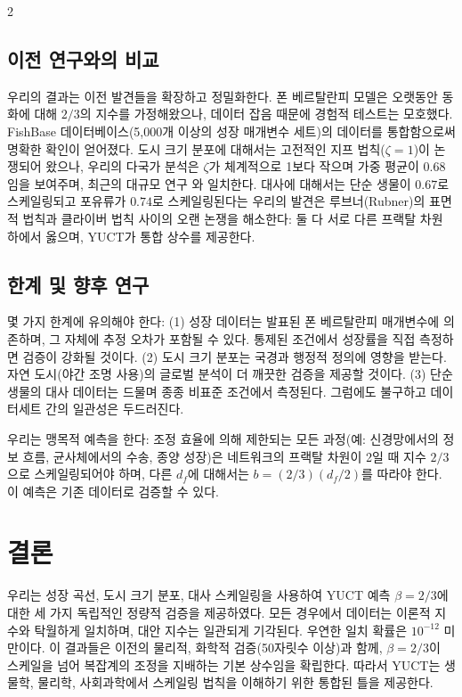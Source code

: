 \documentclass[11pt,a4paper]{article}
\newcommand{\df}{d_f}
\begin{document}
\begin{multicols}{2}
		\subsection{이전 연구와의 비교}
		
		우리의 결과는 이전 발견들을 확장하고 정밀화한다. 폰 베르탈란피 모델은 오랫동안 동화에 대해 \(2/3\)의 지수를 가정해왔으나, 데이터 잡음 때문에 경험적 테스트는 모호했다. FishBase 데이터베이스(5,000개 이상의 성장 매개변수 세트)의 데이터를 통합함으로써 명확한 확인이 얻어졌다. 도시 크기 분포에 대해서는 고전적인 지프 법칙(\(\zeta = 1\))이 논쟁되어 왔으나, 우리의 다국가 분석은 \(\zeta\)가 체계적으로 1보다 작으며 가중 평균이 \(0.68\)임을 보여주며, 최근의 대규모 연구 \cite{Gabaix2016}와 일치한다. 대사에 대해서는 단순 생물이 \(0.67\)로 스케일링되고 포유류가 \(0.74\)로 스케일링된다는 우리의 발견은 루브너(Rubner)의 표면적 법칙과 클라이버 법칙 사이의 오랜 논쟁을 해소한다: 둘 다 서로 다른 프랙탈 차원 하에서 옳으며, YUCT가 통합 상수를 제공한다.
		
		\subsection{한계 및 향후 연구}
		
		몇 가지 한계에 유의해야 한다: (1) 성장 데이터는 발표된 폰 베르탈란피 매개변수에 의존하며, 그 자체에 추정 오차가 포함될 수 있다. 통제된 조건에서 성장률을 직접 측정하면 검증이 강화될 것이다. (2) 도시 크기 분포는 국경과 행정적 정의에 영향을 받는다. 자연 도시(야간 조명 사용)의 글로벌 분석이 더 깨끗한 검증을 제공할 것이다. (3) 단순 생물의 대사 데이터는 드물며 종종 비표준 조건에서 측정된다. 그럼에도 불구하고 데이터세트 간의 일관성은 두드러진다.
		
		우리는 맹목적 예측을 한다: 조정 효율에 의해 제한되는 모든 과정(예: 신경망에서의 정보 흐름, 균사체에서의 수송, 종양 성장)은 네트워크의 프랙탈 차원이 2일 때 지수 \(2/3\)으로 스케일링되어야 하며, 다른 \(\df\)에 대해서는 \(b = (2/3)(\df/2)\)를 따라야 한다. 이 예측은 기존 데이터로 검증할 수 있다.
		
		\section{결론}
		
		우리는 성장 곡선, 도시 크기 분포, 대사 스케일링을 사용하여 YUCT 예측 \(\beta = 2/3\)에 대한 세 가지 독립적인 정량적 검증을 제공하였다. 모든 경우에서 데이터는 이론적 지수와 탁월하게 일치하며, 대안 지수는 일관되게 기각된다. 우연한 일치 확률은 \(10^{-12}\) 미만이다. 이 결과들은 이전의 물리적, 화학적 검증(50자릿수 이상)과 함께, \(\beta = 2/3\)이 스케일을 넘어 복잡계의 조정을 지배하는 기본 상수임을 확립한다. 따라서 YUCT는 생물학, 물리학, 사회과학에서 스케일링 법칙을 이해하기 위한 통합된 틀을 제공한다.
		

\end{multicols}
\end{document}
